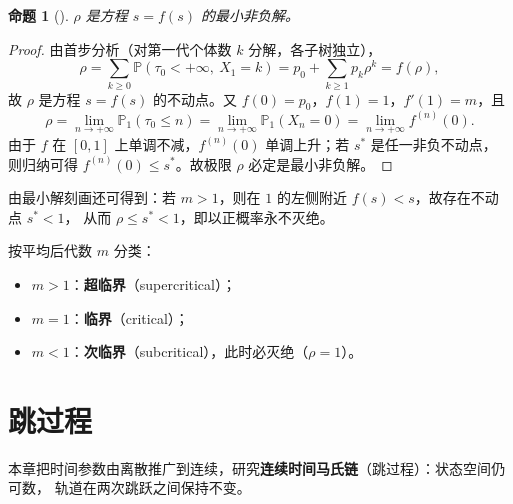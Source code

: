 \documentclass[lang=cn,10pt,newtx,thmcnt=chapter,mode=simple]{vividbook}
\providecommand{\Pp}{}\renewcommand{\Pp}{\mathbb{P}}
\newcommand{\chapterheadfix}[1]{\vspace*{1.2cm}\markboth{\xchaptertitle\ #1}{}}
\theoremstyle{vividthm}
\newtheorem*{vividproposition}{命题}
\theoremstyle{vividdef}
\theoremstyle{vividexa}
\theoremstyle{vividrem}
\renewenvironment{proposition}[1][]{\begin{vividproposition}[#1]}{\end{vividproposition}}
\begin{document}
\begin{proposition}
$\rho$ 是方程 $s=f(s)$ 的最小非负解。
\end{proposition}

\begin{proof}
由首步分析（对第一代个体数 $k$ 分解，各子树独立），
\[
\rho=\sum_{k\ge0}\Pp(\tau_0<+\infty,\ X_1=k)
=p_0+\sum_{k\ge1}p_k\rho^k=f(\rho),
\]
故 $\rho$ 是方程 $s=f(s)$ 的不动点。又 $f(0)=p_0$，$f(1)=1$，$f'(1)=m$，且
\[
\rho=\lim_{n\to+\infty}\Pp_1(\tau_0\le n)
=\lim_{n\to+\infty}\Pp_1(X_n=0)
=\lim_{n\to+\infty}f^{(n)}(0).
\]
由于 $f$ 在 $[0,1]$ 上单调不减，$f^{(n)}(0)$ 单调上升；若 $s^*$ 是任一非负不动点，
则归纳可得 $f^{(n)}(0)\le s^*$。故极限 $\rho$ 必定是最小非负解。
\end{proof}

\begin{center}
\end{center}

由最小解刻画还可得到：若 $m>1$，则在 $1$ 的左侧附近 $f(s)<s$，故存在不动点 $s^*<1$，
从而 $\rho\le s^*<1$，即以正概率永不灭绝。

按平均后代数 $m$ 分类：
\begin{itemize}
  \item $m>1$：\textbf{超临界}（supercritical）；
  \item $m=1$：\textbf{临界}（critical）；
  \item $m<1$：\textbf{次临界}（subcritical），此时必灭绝（$\rho=1$）。
\end{itemize}

\chapter{跳过程}
\chapterheadfix{跳过程}

本章把时间参数由离散推广到连续，研究\textbf{连续时间马氏链}（跳过程）：状态空间仍可数，
轨道在两次跳跃之间保持不变。
\end{document}
